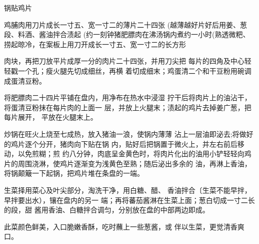 \begin{recipe}{锅贴鸡片}

\ingredients


\cooking

\step 鸡脯肉用刀片成长一寸五、宽一寸二的薄片二十四张 (越薄越好片好后用姜、葱段、料酒、酱油拌合渍起 (约一刻钟猪肥膘肉在沸汤锅内煮约一小时(熟透微粑、 捞起晾冷，在案板上用刀开成长一寸五、宽一寸二的长方形

肉块，再把刀放平片成厚一分的肉片二十四张，并用刀尖把 每片的四角及中心轻轻戳一个孔；瘦火腿先切成细丝，再横 着切成细末；鸡蛋清二个和干豆粉用碗调成蛋清豆粉。

\step 	将肥膘肉二十四片平铺在盘内，用净布在热水中浸湿 拧干后将肉片上的油沾干，将蛋清豆粉抹在每片肉的上面一 层，并放上火腿末；渍起的鸡片去掉姜广葱，把每片展开， 平放在火腿末上。

\step 	炒锅在旺火上烧至七成热，放入猪油一浪，使锅内薄薄 沾上一层油即泌去;将做好的鸡片逐个分开，猪肉向下贴在锅 内，贴好后把锅置于微火上，并左右前后移动，以免煎糊；煎 约八分钟，肉底呈金黄色时，将肉片化出的油用小铲轻轻向鸡 片的周围浇淋，使鸡片逐渐变为浅黄色至熟；随后泌出多余的 油，再淋上香油，将锅颠簸一下起锅，把鸡片堆在条盘的一端。

\step 生菜择用菜心及叶尖部分，淘洗干净，用白糖、醋、 香油拌合〔生菜不能早拌，早拌要出水），镶在盘内的另一 端；再将蕃茄酱淋在生菜上面；葱白切成一寸二长的段，甜 酱用香油、白糖拌合调匀，分别放在盘的中部两边即成。

\notes

此菜颜色鲜美，入口脆嫩香酥，吃时蘸上一些葱酱，或 伴以生菜，更觉清香爽口。

\end{recipe}

